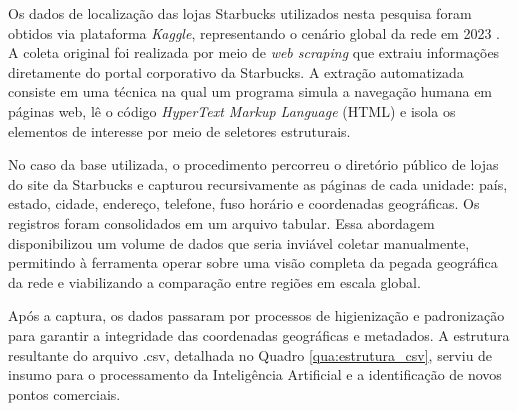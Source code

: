 Os dados de localização das lojas Starbucks utilizados nesta pesquisa foram obtidos via plataforma \textit{Kaggle}, representando o cenário global da rede em 2023 \cite{omarsobhy2023}. A coleta original foi realizada por meio de \textit{web scraping} que extraiu informações diretamente do portal corporativo da Starbucks. A extração automatizada consiste em uma técnica na qual um programa simula a navegação humana em páginas web, lê o código \textit{HyperText Markup Language} (HTML) e isola os elementos de interesse por meio de seletores estruturais.

No caso da base utilizada, o procedimento percorreu o diretório público de lojas do site da Starbucks e capturou recursivamente as páginas de cada unidade: país, estado, cidade, endereço, telefone, fuso horário e coordenadas geográficas. Os registros foram consolidados em um arquivo tabular. Essa abordagem disponibilizou um volume de dados que seria inviável coletar manualmente, permitindo à ferramenta operar sobre uma visão completa da pegada geográfica da rede e viabilizando a comparação entre regiões em escala global.

Após a captura, os dados passaram por processos de higienização e padronização para garantir a integridade das coordenadas geográficas e metadados. A estrutura resultante do arquivo .csv, detalhada no Quadro \ref{qua:estrutura_csv}, serviu de insumo para o processamento da Inteligência Artificial e a identificação de novos pontos comerciais.

